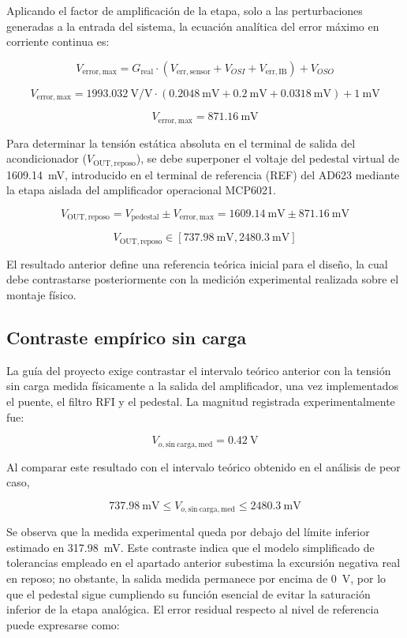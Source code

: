 Aplicando el factor de amplificación de la etapa, solo a las perturbaciones generadas a la entrada del sistema, la ecuación analítica del error máximo en corriente continua es:

$$V_{\mathrm{error,max}}=G_{\mathrm{real}} \cdot (V_{\mathrm{err,sensor}} + V_{OSI} + V_{\mathrm{err,IB}}) + V_{OSO}$$

$$V_{\mathrm{error,max}}= \SI{1993.032}{\V\per\V} \cdot (\SI{0.2048}{\milli\V} + \SI{0.2}{\milli\V} + \SI{0.0318}{\milli\V}) + \SI{1}{\milli\V}$$

$$V_{\mathrm{error,max}}= \SI{871.16}{\milli\V}$$

Para determinar la tensión estática absoluta en el terminal de salida del acondicionador ($V_{\mathrm{OUT,reposo}}$), se debe superponer el voltaje del pedestal virtual de \SI{1609.14}{\milli\V}, introducido en el terminal de referencia (REF) del AD623 mediante la etapa aislada del amplificador operacional MCP6021.

$$ V_{\mathrm{OUT,reposo}} = V_{\mathrm{pedestal}} \pm V_{\mathrm{error,max}} = \SI{1609.14}{\milli\V} \pm \SI{871.16}{\milli\V} $$

$$ V_{\mathrm{OUT,reposo}} \in [\SI{737.98}{\milli\V}, \SI{2480.3}{\milli\V}] $$

El resultado anterior define una referencia teórica inicial para el diseño, la cual debe contrastarse posteriormente con la medición experimental realizada sobre el montaje físico.

\subsection{Contraste empírico sin carga}

La guía del proyecto exige contrastar el intervalo teórico anterior con la tensión sin carga medida físicamente a la salida del amplificador, una vez implementados el puente, el filtro RFI y el pedestal. La magnitud registrada experimentalmente fue:

\[
    V_{o,\mathrm{sin\ carga,med}} = \SI{0.42}{\V}
\]

Al comparar este resultado con el intervalo teórico obtenido en el análisis de peor caso,

\[
    \SI{737.98}{\milli\V} \leq V_{o,\mathrm{sin\ carga,med}} \leq \SI{2480.3}{\milli\V}
\]

Se observa que la medida experimental queda por debajo del límite inferior estimado en \SI{317.98}{\milli\V}. Este contraste indica que el modelo simplificado de tolerancias empleado en el apartado anterior subestima la excursión negativa real en reposo; no obstante, la salida medida permanece por encima de \SI{0}{\V}, por lo que el pedestal sigue cumpliendo su función esencial de evitar la saturación inferior de la etapa analógica. El error residual respecto al nivel de referencia puede expresarse como:

